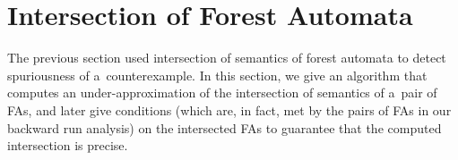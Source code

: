 {%
\section{Intersection of Forest Automata}\label{sec:intersection}

%
%


The previous section used intersection of semantics of forest automata to
detect spuriousness of a~counterexample.
In this section, we give an algorithm that computes an under-approximation of
the intersection of semantics of a~pair of FAs, and later give conditions
(which are, in fact, met by the pairs of FAs in our backward run analysis) on
the intersected FAs to guarantee that the computed intersection is precise.

}
